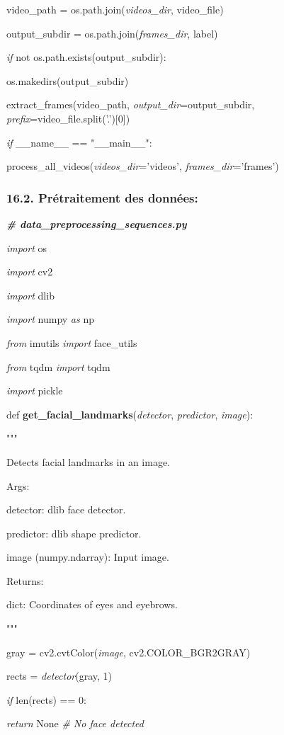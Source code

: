 \documentclass[
]{article}
\begin{document}
video\_path = os.path.join(\emph{videos\_dir}, video\_file)

output\_subdir = os.path.join(\emph{frames\_dir}, label)

\emph{if} not os.path.exists(output\_subdir):

os.makedirs(output\_subdir)

extract\_frames(video\_path, \emph{output\_dir}=output\_subdir, \emph{prefix}=video\_file.split('.'){[}0{]})

\emph{if} \_\_name\_\_ == "\_\_main\_\_":

process\_all\_videos(\emph{videos\_dir}='videos', \emph{frames\_dir}='frames')

\hypertarget{pruxe9traitement-des-donnuxe9es}{%
\subsubsection{16.2. Prétraitement des données:}\label{pruxe9traitement-des-donnuxe9es}}

\emph{\textbf{\# data\_preprocessing\_sequences.py}}

\emph{import} os

\emph{import} cv2

\emph{import} dlib

\emph{import} numpy \emph{as} np

\emph{from} imutils \emph{import} face\_utils

\emph{from} tqdm \emph{import} tqdm

\emph{import} pickle

def \textbf{get\_facial\_landmarks}(\emph{detector}, \emph{predictor}, \emph{image}):

"""

Detects facial landmarks in an image.

Args:

detector: dlib face detector.

predictor: dlib shape predictor.

image (numpy.ndarray): Input image.

Returns:

dict: Coordinates of eyes and eyebrows.

"""

gray = cv2.cvtColor(\emph{image}, cv2.COLOR\_BGR2GRAY)

rects = \emph{detector}(gray, 1)

\emph{if} len(rects) == 0:

\emph{return} None \emph{\# No face detected}
\end{document}
